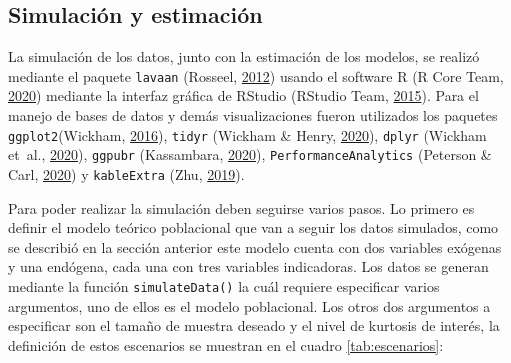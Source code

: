 \documentclass[
  english]{revcoles}
\begin{document}
\subsection{Simulación y estimación}

La simulación de los datos, junto con la estimación de los modelos, se
realizó mediante el paquete \texttt{lavaan} (Rosseel,
\protect\hyperlink{ref-lavaan}{2012}) usando el software R (R Core Team,
\protect\hyperlink{ref-R}{2020}) mediante la interfaz gráfica de RStudio
(RStudio Team, \protect\hyperlink{ref-RStudio}{2015}). Para el manejo de
bases de datos y demás visualizaciones fueron utilizados los paquetes
\texttt{ggplot2}(Wickham, \protect\hyperlink{ref-ggplot2}{2016}),
\texttt{tidyr} (Wickham \& Henry, \protect\hyperlink{ref-tidyr}{2020}),
\texttt{dplyr} (Wickham et~al., \protect\hyperlink{ref-dplyr}{2020}),
\texttt{ggpubr} (Kassambara, \protect\hyperlink{ref-ggpubr}{2020}),
\texttt{PerformanceAnalytics} (Peterson \& Carl,
\protect\hyperlink{ref-PerformanceAnalytics}{2020}) y
\texttt{kableExtra} (Zhu, \protect\hyperlink{ref-kableExtra}{2019}).

Para poder realizar la simulación deben seguirse varios pasos. Lo
primero es definir el modelo teórico poblacional que van a seguir los
datos simulados, como se describió en la sección anterior este modelo
cuenta con dos variables exógenas y una endógena, cada una con tres
variables indicadoras. Los datos se generan mediante la función
\texttt{simulateData()} la cuál requiere especificar varios argumentos,
uno de ellos es el modelo poblacional. Los otros dos argumentos a
especificar son el tamaño de muestra deseado y el nivel de kurtosis de
interés, la definición de estos escenarios se muestran en el cuadro
\ref{tab:escenarios}:

\begin{table}[!h]

\caption{\label{tab:unnamed-chunk-6}\label{tab:escenarios}Escenarios de simulación}
\centering
{}
\end{table}
\end{document}
